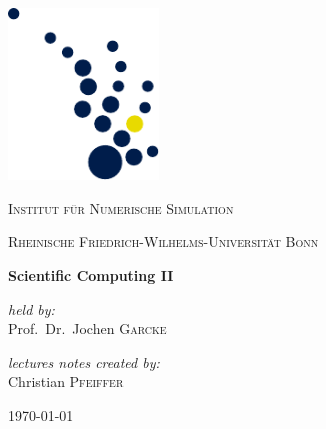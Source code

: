 \documentclass[11pt, oneside, parskip=yes]{scrbook}
\begin{document}
\frontmatter
\begin{titlepage}

	\centering

	\includegraphics[width=0.30\textwidth]{INS-Logo_ohne}\par\vspace{2.2cm}
	
	\textsc{\LARGE Institut für Numerische Simulation}\par\vspace{0.3cm}
	\textsc{\small Rheinische Friedrich-Wilhelms-Universität Bonn}\par\vspace{0.9cm}
	
	\vfill

	\begin{mdframed}[rightline=false,linewidth=0.5mm,leftline=false,innerbottommargin=\baselineskip,innertopmargin=\baselineskip]
	\centering\textbf{\huge Scientific Computing II}
	\end{mdframed}
	
	\vspace{1.5cm}
	
	\begin{minipage}{0.4\textwidth}
		\centering\large
		\textit{held by:} \\
		Prof.\ Dr.\ Jochen \textsc{Garcke}
	\end{minipage}
	\vfill
	\vfill
	\vfill
	\vfill
	\begin{minipage}{0.4\textwidth}
		\centering\large
		\textit{lectures notes created by:}\\
		Christian \textsc{Pfeiffer}
	\end{minipage}
	
	\vfill
	
	{\large \today}

\end{titlepage}

\printacronyms
\tableofcontents

\mainmatter











\backmatter
\printindex[keydefinitions]
\printbibliography[heading=bibintoc]
\end{document}
